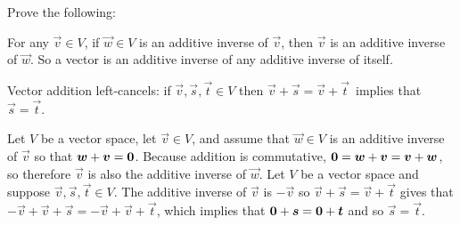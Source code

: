 
\begin{Exercise}[
name={},
title={}, 
difficulty=0,
origin={\cite{JH}}]
Prove the following:

\Question For any $\vec{v}\in V$, if $\vec{w}\in V$ is an additive
        inverse of $\vec{v}$, then $\vec{v}$ is an additive inverse of
        $\vec{w}$.
        So a vector is an additive inverse of any additive inverse of
        itself.

\Question Vector addition left-cancels: if
        \( \vec{v},\vec{s},\vec{t}\in V \)
        then \( \vec{v}+\vec{s}=\vec{v}+\vec{t}\, \) implies
        that \( \vec{s}=\vec{t} \).

\end{Exercise}

\begin{Answer}

\Question Let \( V \) be a vector space,
          let \( \vec{v}\in V \), and
          assume that \( \vec{w}\in V \) is an additive inverse of $\vec{v}$
          so that \( \bm{w}+\bm{v}=\bm{0} \).
          Because addition is commutative,
          \( \bm{0}=\bm{w}+\bm{v}=\bm{v}+\bm{w} \),
          so therefore \( \vec{v} \) is also
          the additive inverse of \( \vec{w} \).
\Question Let \( V \) be a vector space and suppose
          \( \vec{v},\vec{s},\vec{t}\in V \).
          The additive inverse of \( \vec{v} \) is \( -\vec{v} \) so
          \( \vec{v}+\vec{s}=\vec{v}+\vec{t} \) gives that
          \( -\vec{v}+\vec{v}+\vec{s}=-\vec{v}+\vec{v}+\vec{t} \),
          which implies that \( \bm{0}+\bm{s}=\bm{0}+\bm{t} \) and so
          \( \vec{s}=\vec{t} \).


\end{Answer}
